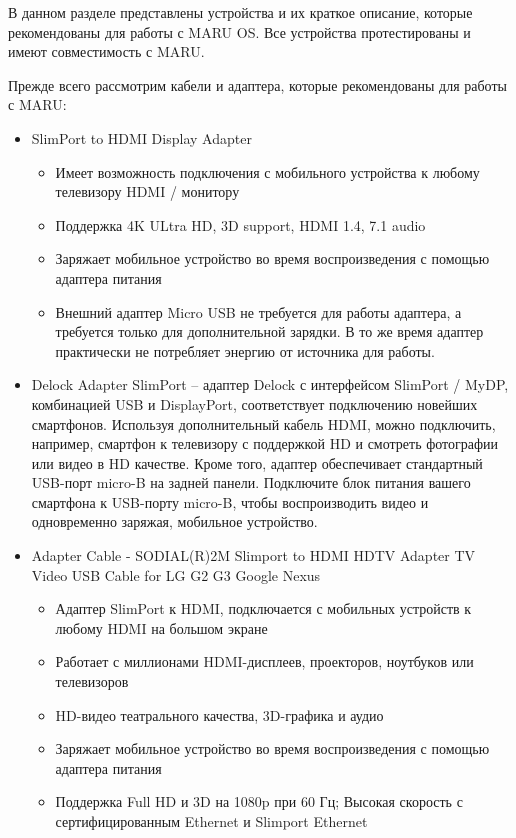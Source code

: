\documentclass[a4paper, 14pt]{article}
\begin{document}
\par В данном разделе представлены устройства и их краткое описание, которые рекомендованы для работы с MARU OS. Все устройства протестированы и имеют совместимость с MARU.

\par Прежде всего рассмотрим кабели и адаптера, которые рекомендованы для работы с MARU:
\begin{itemize}
    \item SlimPort to HDMI Display Adapter
    \begin{itemize}
        \item Имеет возможность подключения с мобильного устройства к любому телевизору HDMI / монитору
        \item Поддержка 4K ULtra HD, 3D support, HDMI 1.4, 7.1 audio
        \item Заряжает мобильное устройство во время воспроизведения с помощью адаптера питания
        \item Внешний адаптер Micro USB не требуется для работы адаптера, а требуется только для дополнительной зарядки. В то же время адаптер практически не потребляет энергию от источника для работы.
    \end{itemize}
    \item Delock Adapter SlimPort -- адаптер Delock с интерфейсом SlimPort / MyDP, комбинацией USB и DisplayPort, соответствует подключению новейших смартфонов. Используя дополнительный кабель HDMI, можно подключить, например, смартфон к телевизору с поддержкой HD и смотреть фотографии или видео в HD качестве. Кроме того, адаптер обеспечивает стандартный USB-порт micro-B на задней панели. Подключите блок питания вашего смартфона к USB-порту micro-B, чтобы воспроизводить видео и одновременно заряжая, мобильное устройство.
    \item Adapter Cable - SODIAL(R)2M Slimport to HDMI HDTV Adapter TV Video USB Cable for LG G2 G3 Google Nexus
    \begin{itemize}
        \item Адаптер SlimPort к HDMI, подключается с мобильных устройств к любому HDMI на большом экране
        \item Работает с миллионами HDMI-дисплеев, проекторов, ноутбуков или телевизоров
        \item HD-видео театрального качества, 3D-графика и аудио
        \item Заряжает мобильное устройство во время воспроизведения с помощью адаптера питания
        \item Поддержка Full HD и 3D на 1080p при 60 Гц; Высокая скорость с сертифицированным Ethernet и Slimport Ethernet
    \end{itemize}
\end{itemize}
\end{document}
